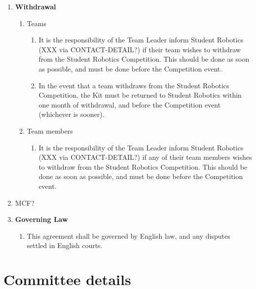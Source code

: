 \documentclass[a4paper, 11pt]{scrartcl}
\begin{document}
\begin{enumerate}
\item \textbf{Withdrawal}
\begin{enumerate}

\item Teams
\begin{enumerate}
\item It is the responsibility of the Team Leader inform
Student Robotics (XXX via CONTACT-DETAIL?) if their team wishes to withdraw
from the Student Robotics Competition. This should be done as soon as possible,
and must be done before the Competition event.

\item In the event that a team withdraws from the Student Robotics Competition,
the Kit must be returned to Student Robotics within one month of withdrawal,
and before the Competition event (whichever is sooner).
\end{enumerate}

\item Team members
\begin{enumerate}
\item It is the responsibility of the Team Leader inform Student Robotics
(XXX via CONTACT-DETAIL?) if any of their team members wishes to withdraw
from the Student Robotics Competition. This should be done as soon as possible,
and must be done before the Competition event.
\end{enumerate}

\end{enumerate}

\item MCF?

\item \textbf{Governing Law}

\begin{enumerate}

\item This agreement shall be governed by English law, and any disputes settled
in English courts.

\end{enumerate}

\end{enumerate}

\appendix



\section{Committee details}
\end{document}
